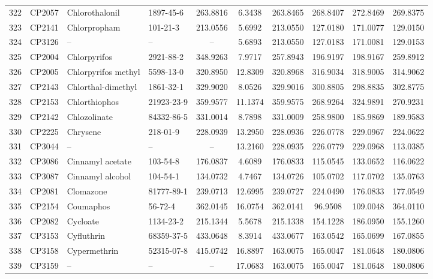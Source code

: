 \begin{longtable}{clllcccccc}
322 & CP2057 & Chlorothalonil & 1897-45-6 & 263.8816 & 6.3438 & 263.8465 & 268.8407 & 272.8469 & 269.8375 \\ 
323 & CP2141 & Chlorpropham & 101-21-3 & 213.0556 & 5.6992 & 213.0550 & 127.0180 & 171.0077 & 129.0150 \\ 
324 & CP3126 & – & – & – & 5.6893 & 213.0550 & 127.0183 & 171.0081 & 129.0153 \\ 
325 & CP2004 & Chlorpyrifos & 2921-88-2 & 348.9263 & 7.9717 & 257.8943 & 196.9197 & 198.9167 & 259.8912 \\ 
326 & CP2005 & Chlorpyrifos methyl & 5598-13-0 & 320.8950 & 12.8309 & 320.8968 & 316.9034 & 318.9005 & 314.9062 \\ 
327 & CP2143 & Chlorthal-dimethyl & 1861-32-1 & 329.9020 & 8.0526 & 329.9016 & 300.8805 & 298.8835 & 302.8775 \\ 
328 & CP2153 & Chlorthiophos & 21923-23-9 & 359.9577 & 11.1374 & 359.9575 & 268.9264 & 324.9891 & 270.9231 \\ 
329 & CP2142 & Chlozolinate & 84332-86-5 & 331.0014 & 8.7898 & 331.0009 & 258.9800 & 185.9869 & 189.9583 \\ 
330 & CP2225 & Chrysene\smash{\textsuperscript{\textdaggerdbl}} & 218-01-9 & 228.0939 & 13.2950 & 228.0936 & 226.0778 & 229.0967 & 224.0622 \\ 
331 & CP3044 & – & – & – & 13.2160 & 228.0935 & 226.0779 & 229.0968 & 113.0385 \\ 
332 & CP3086 & Cinnamyl acetate & 103-54-8 & 176.0837 & 4.6089 & 176.0833 & 115.0545 & 133.0652 & 116.0622 \\ 
333 & CP3087 & Cinnamyl alcohol & 104-54-1 & 134.0732 & 4.7467 & 134.0726 & 105.0702 & 117.0702 & 135.0763 \\ 
334 & CP2081 & Clomazone & 81777-89-1 & 239.0713 & 12.6995 & 239.0727 & 224.0490 & 176.0833 & 177.0549 \\ 
335 & CP2154 & Coumaphos & 56-72-4 & 362.0145 & 16.0754 & 362.0141 & 96.9508 & 109.0048 & 364.0110 \\ 
336 & CP2082 & Cycloate & 1134-23-2 & 215.1344 & 5.5678 & 215.1338 & 154.1228 & 186.0950 & 155.1260 \\ 
337 & CP3153 & Cyfluthrin\smash{\textsuperscript{\textdaggerdbl}} & 68359-37-5 & 433.0648 & 8.3914 & 433.0677 & 163.0542 & 165.0699 & 167.0855 \\ 
338 & CP3158 & Cypermethrin\smash{\textsuperscript{\textdaggerdbl}} & 52315-07-8 & 415.0742 & 16.8897 & 163.0075 & 165.0047 & 181.0648 & 180.0806 \\ 
339 & CP3159 & – & – & – & 17.0683 & 163.0075 & 165.0047 & 181.0648 & 180.0806 \\ 

\end{longtable}
